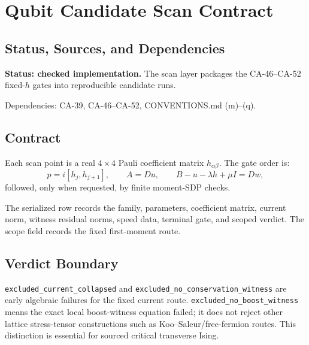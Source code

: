 
\section{Qubit Candidate Scan Contract}
\label{sec:qubit-candidate-scan-contract}

\subsection{Status, Sources, and Dependencies}

\textbf{Status: checked implementation.}  The scan layer packages the CA-46--CA-52
fixed-\(h\) gates into reproducible candidate runs.

Dependencies: CA-39, CA-46--CA-52, CONVENTIONS.md (m)--(q).


\subsection{Contract}

Each scan point is a real \(4\times4\) Pauli coefficient matrix
\(h_{\alpha\beta}\).  The gate order is:
\[
  p=i[h_j,h_{j+1}],\qquad A=Du,\qquad
  B-u-\lambda h+\mu I=Dw,
\]
followed, only when requested, by finite moment-SDP checks.

The serialized row records the family, parameters, coefficient matrix, current
norm, witness residual norms, speed data, terminal gate, and scoped verdict.
The scope field records the fixed first-moment route.

\subsection{Verdict Boundary}

\texttt{excluded\_current\_collapsed} and
\texttt{excluded\_no\_conservation\_witness} are early algebraic failures for
the fixed current route.  \texttt{excluded\_no\_boost\_witness} means the exact
local boost-witness equation failed; it does not reject other lattice
stress-tensor constructions such as Koo--Saleur/free-fermion routes.  This
distinction is essential for sourced critical transverse Ising.
